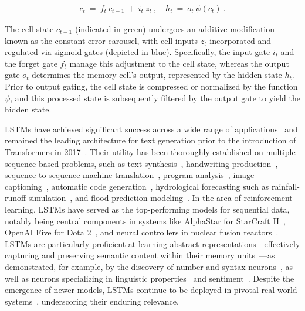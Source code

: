 \begin{align}
\label{eq:lstm_idea}
  c_t \ = \ f_t \ c_{t-1} \ + \ 
          i_t \  z_t \ , \quad  
          h_t \ = \ o_t \ \psi({c_t}) \ . 
\end{align}

The cell state $c_{t-1}$ (indicated in green) undergoes an additive modification known as the constant error carousel, with cell inputs $z_t$ incorporated and regulated via sigmoid gates (depicted in blue). Specifically, the input gate $i_t$ and the forget gate $f_t$ manage this adjustment to the cell state, whereas the output gate $o_t$ determines the memory cell's output, represented by the hidden state $h_t$. Prior to output gating, the cell state is compressed or normalized by the function $\psi$, and this processed state is subsequently filtered by the output gate to yield the hidden state.

LSTMs have achieved significant success across a wide range of applications~\citep{Hochreiter:01,Hochreiter:07,Schmidhuber:15} and remained the leading architecture for text generation prior to the introduction of Transformers in 2017~\citep{Vaswani:17}. Their utility has been thoroughly established on multiple sequence-based problems, such as text synthesis~\citep{Graves:13,Karpathy:15blog}, handwriting production~\citep{Graves:13}, sequence-to-sequence machine translation~\citep{Sutskever:14nips}, program analysis~\citep{Zaremba:14arxiv}, image captioning~\citep{Karpathy:15,Hossain:19}, automatic code generation~\citep{Karpathy:15blog}, hydrological forecasting such as rainfall-runoff simulation~\citep{Kratzert:18,Kratzert:19}, and flood prediction modeling~\citep{Nearing:24}. In the area of reinforcement learning, LSTMs have served as the top-performing models for sequential data, notably being central components in systems like AlphaStar for StarCraft II~\citep{Vinyals:17short}, OpenAI Five for Dota 2~\citep{OpenAI:19}, and neural controllers in nuclear fusion reactors~\citep{Degrave:22short}. LSTMs are particularly proficient at learning abstract representations—effectively capturing and preserving semantic content within their memory units~\citep{Karpathy:15blog}—as demonstrated, for example, by the discovery of number and syntax neurons~\citep{Lakretz:19}, as well as neurons specializing in linguistic properties~\citep{Bau:19} and sentiment~\citep{Radford:17arxiv}. Despite the emergence of newer models, LSTMs continue to be deployed in pivotal real-world systems~\citep{Degrave:22short,Nearing:24}, underscoring their enduring relevance.

